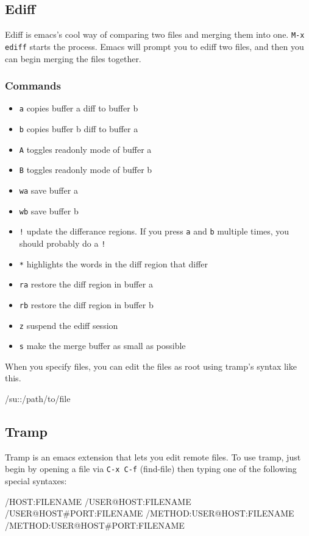 \documentclass[11pt]{article}
\begin{document}
\subsection{Ediff}
\label{sec:orgheadline29}
Ediff is emacs's cool way of comparing two files and merging them into one.  \texttt{M-x ediff} starts the process.  Emacs will prompt you to ediff two files, and then you can begin merging the files together.
\subsubsection{Commands}
\label{sec:orgheadline28}
\begin{itemize}
\item \texttt{a} copies buffer a diff to buffer b
\item \texttt{b} copies buffer b diff to buffer a
\item \texttt{A} toggles readonly mode of buffer a
\item \texttt{B} toggles readonly mode of buffer b
\item \texttt{wa} save buffer a
\item \texttt{wb} save buffer b
\item \texttt{!} update the differance regions.  If you press \texttt{a} and \texttt{b} multiple times, you should probably do a \texttt{!}
\item \texttt{*} highlights the words in the diff region that differ
\item \texttt{ra} restore the diff region in buffer a
\item \texttt{rb} restore the diff region in buffer b
\item \texttt{z} suspend the ediff session
\item \texttt{s} make the merge buffer as small as possible
\end{itemize}

When you specify files, you can edit the files as root using tramp's syntax like this.

/su::/path/to/file
\subsection{Tramp}
\label{sec:orgheadline30}
Tramp is an emacs extension that lets you edit remote files. To use tramp, just begin by opening a file via \texttt{C-x C-f} (find-file) then typing one of the following special syntaxes:

/HOST:FILENAME
/USER@HOST:FILENAME
/USER@HOST\#PORT:FILENAME
/METHOD:USER@HOST:FILENAME
/METHOD:USER@HOST\#PORT:FILENAME
\end{document}
